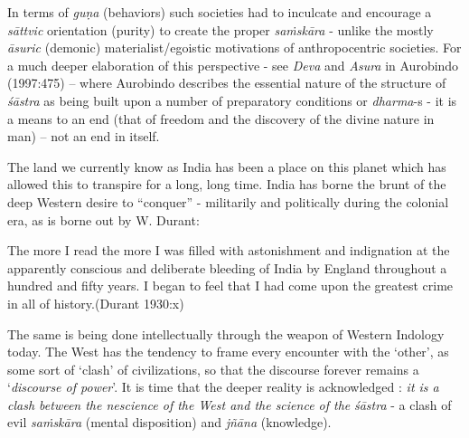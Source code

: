 In terms of {\sl guṇa} (behaviors) such societies had to inculcate and encourage a {\sl sāttvic} orientation (purity) to create the proper {\sl saṁskāra} - unlike the mostly {\sl āsuric} (demonic) materialist/egoistic motivations of anthropocentric societies. For a much deeper elaboration of this perspective - see {\sl Deva} and {\sl Asura} in Aurobindo (1997:475) -- where Aurobindo describes the essential nature of the structure of {\sl śāstra} as being built upon a number of preparatory conditions or {\sl dharma}-s - it is a means to an end (that of freedom and the discovery of the divine nature in man) – not an end in itself.

The land we currently know as India has been a place on this planet which has allowed this to transpire for a long, long time. India has borne the brunt of the deep Western desire to ``conquer'' - militarily and politically during the colonial era, as is borne out by W. Durant:
\begin{myquote}
The more I read the more I was filled with astonishment and indignation at the apparently conscious and deliberate bleeding of India by England throughout a hundred and fifty years. I began to feel that I had come upon the greatest crime in all of history.\hfill  (Durant 1930:x)
\end{myquote}
The same is being done intellectually through the weapon of Western Indology today. The West has the tendency to frame every encounter with the `other', as some sort of `clash' of civilizations, so that the discourse forever remains a `{\sl discourse of power}'. It is time that the deeper reality is acknowledged : {\sl it is a clash between the nescience of the West and the science of the} {{\sl śāstra}\relax} - a clash of evil {\sl saṁskāra} (mental disposition) and {\sl jñāna} (knowledge).\\[-15pt]

